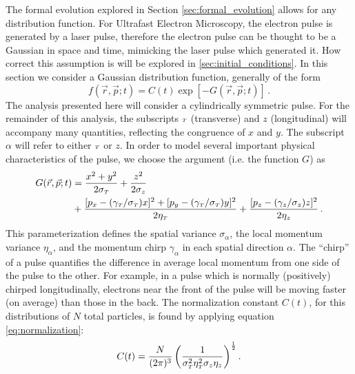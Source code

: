 The formal evolution explored in Section \ref{sec:formal_evolution} allows for any distribution function.
For Ultrafast Electron Microscopy, the electron pulse is generated by a laser pulse, therefore the electron pulse can be thought to be a Gaussian in space and time, mimicking the laser pulse which generated it.
How correct this assumption is will be explored in \ref{sec:initial_conditions}.
In this section we consider a Gaussian distribution function, generally of the form
\begin{equation}
  f(\vec{r}, \vec{p}; t) = C(t)\exp \left[ - G(\vec{r}, \vec{p}; t) \right] \,\text{.}
\end{equation}
The analysis presented here will consider a cylindrically symmetric pulse.
For the remainder of this analysis, the subscripts ${\scriptscriptstyle T}$ (transverse) and $z$ (longitudinal) will accompany many quantities, reflecting the congruence of $x$ and $y$.
The subscript $\alpha$ will refer to either ${\scriptscriptstyle T}$ or $z$.
In order to model several important physical characteristics of the pulse, we choose the argument (i.e. the function $G$) as
\begin{equation} \label{eq:gaussian_exponent}
\begin{split}
  G(\vec{r}, \vec{p}; t) &= \frac{x^2 + y^2}{2 \sigma_{{\scriptscriptstyle T}}} + \frac{z^2}{2 \sigma_{z}} \\
  &+\frac{
        [p_x - (\gamma_{{\scriptscriptstyle T}}/\sigma_{{\scriptscriptstyle T}}) x ]^2 
      + [p_y - (\gamma_{{\scriptscriptstyle T}}/\sigma_{{\scriptscriptstyle T}}) y ]^2
    }{2 \eta_{{\scriptscriptstyle T}}}
  + \frac{ [p_z - (\gamma_{z}/\sigma_{z}) z ]^2 }{2 \eta_{z}} \,\text{.}
\end{split}
\end{equation}
This parameterization defines the spatial variance $\sigma_{\alpha}$, the local momentum variance $\eta_{\alpha}$, and the momentum chirp $\gamma_{\alpha}$ in each spatial direction $\alpha$.
The ``chirp'' of a pulse quantifies the difference in average local momentum from one side of the pulse to the other.
For example, in a pulse which is normally (positively) chirped longitudinally, electrons near the front of the pulse will be moving faster (on average) than those in the back.
The normalization constant $C(t)$, for this distributions of $N$ total particles, is found by applying equation \ref{eq:normalization}:
\begin{equation}
  C(t) = \frac{N}{(2\pi)^3} 
  \left( 
    \frac{1}{\sigma_{{\scriptscriptstyle T}}^2\eta_{{\scriptscriptstyle T}}^2\sigma_{z}\eta_{z}}
  \right)^{\frac{1}{2}} \text{.}
\end{equation}

